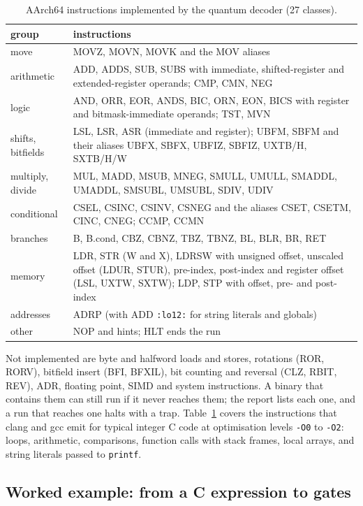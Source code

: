 \documentclass[11pt]{article}
\begin{document}
\begin{table}[H]
\centering
\small
\begin{tabularx}{\textwidth}{@{}lX@{}}
\toprule
group & instructions \\
\midrule
move & MOVZ, MOVN, MOVK and the MOV aliases \\
arithmetic & ADD, ADDS, SUB, SUBS with immediate, shifted-register and extended-register operands; CMP, CMN, NEG \\
logic & AND, ORR, EOR, ANDS, BIC, ORN, EON, BICS with register and bitmask-immediate operands; TST, MVN \\
shifts, bitfields & LSL, LSR, ASR (immediate and register); UBFM, SBFM and their aliases UBFX, SBFX, UBFIZ, SBFIZ, UXTB/H, SXTB/H/W \\
multiply, divide & MUL, MADD, MSUB, MNEG, SMULL, UMULL, SMADDL, UMADDL, SMSUBL, UMSUBL, SDIV, UDIV \\
conditional & CSEL, CSINC, CSINV, CSNEG and the aliases CSET, CSETM, CINC, CNEG; CCMP, CCMN \\
branches & B, B.cond, CBZ, CBNZ, TBZ, TBNZ, BL, BLR, BR, RET \\
memory & LDR, STR (W and X), LDRSW with unsigned offset, unscaled offset (LDUR, STUR), pre-index, post-index and register offset (LSL, UXTW, SXTW); LDP, STP with offset, pre- and post-index \\
addresses & ADRP (with ADD \texttt{:lo12:} for string literals and globals) \\
other & NOP and hints; HLT ends the run \\
\bottomrule
\end{tabularx}
\caption{AArch64 instructions implemented by the quantum decoder (27 classes).}
\label{tab:isa}
\end{table}

Not implemented are byte and halfword loads and stores, rotations (ROR, RORV), bitfield
insert (BFI, BFXIL), bit counting and reversal (CLZ, RBIT, REV), ADR, floating point, SIMD and
system instructions. A binary that contains them can still run if it never reaches them; the
report lists each one, and a run that reaches one halts with a trap. Table~\ref{tab:isa}
covers the instructions that clang and gcc emit for typical integer C code at optimisation
levels \texttt{-O0} to \texttt{-O2}: loops, arithmetic, comparisons, function calls with stack
frames, local arrays, and string literals passed to \texttt{printf}.

\subsection{Worked example: from a C expression to gates}
\label{sec:example}
\end{document}
